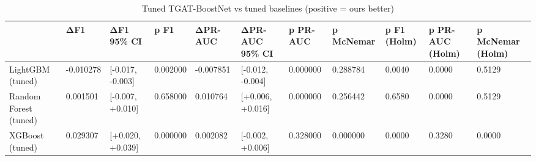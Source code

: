 \begin{table}
\caption{Tuned TGAT-BoostNet vs tuned baselines (positive = ours better)}
\label{tab:04_significance_tuned}
\begin{tabular}{lllllllllll}
\toprule
 & ΔF1 & ΔF1 95\% CI & p F1 & ΔPR-AUC & ΔPR-AUC 95\% CI & p PR-AUC & p McNemar & p F1 (Holm) & p PR-AUC (Holm) & p McNemar (Holm) \\
\midrule
LightGBM (tuned) & -0.010278 & [-0.017, -0.003] & 0.002000 & -0.007851 & [-0.012, -0.004] & 0.000000 & 0.288784 & 0.0040 & 0.0000 & 0.5129 \\
Random Forest (tuned) & 0.001501 & [-0.007, +0.010] & 0.658000 & 0.010764 & [+0.006, +0.016] & 0.000000 & 0.256442 & 0.6580 & 0.0000 & 0.5129 \\
XGBoost (tuned) & 0.029307 & [+0.020, +0.039] & 0.000000 & 0.002082 & [-0.002, +0.006] & 0.328000 & 0.000000 & 0.0000 & 0.3280 & 0.0000 \\
\bottomrule
\end{tabular}
\end{table}

